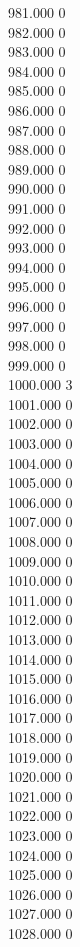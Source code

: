 { 981.000	0 \\
 982.000	0 \\
 983.000	0 \\
 984.000	0 \\
 985.000	0 \\
 986.000	0 \\
 987.000	0 \\
 988.000	0 \\
 989.000	0 \\
 990.000	0 \\
 991.000	0 \\
 992.000	0 \\
 993.000	0 \\
 994.000	0 \\
 995.000	0 \\
 996.000	0 \\
 997.000	0 \\
 998.000	0 \\
 999.000	0 \\
 1000.000	3 \\
 1001.000	0 \\
 1002.000	0 \\
 1003.000	0 \\
 1004.000	0 \\
 1005.000	0 \\
 1006.000	0 \\
 1007.000	0 \\
 1008.000	0 \\
 1009.000	0 \\
 1010.000	0 \\
 1011.000	0 \\
 1012.000	0 \\
 1013.000	0 \\
 1014.000	0 \\
 1015.000	0 \\
 1016.000	0 \\
 1017.000	0 \\
 1018.000	0 \\
 1019.000	0 \\
 1020.000	0 \\
 1021.000	0 \\
 1022.000	0 \\
 1023.000	0 \\
 1024.000	0 \\
 1025.000	0 \\
 1026.000	0 \\
 1027.000	0 \\
 1028.000	0 \\
}
